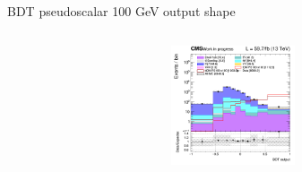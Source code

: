 \documentclass[8pt]{beamer}
\begin{document}
\begin{frame}{BDT pseudoscalar 100 GeV output shape}
\begin{columns}
\begin{column}{0.33\textwidth}
\begin{center}
			\begin{block}{}\end{block}	
     			\includegraphics[width=1.0\textwidth, height=100pt]{figs/2018/SmearSR-ttDM-pseudo100/log_cratio_ST_topCR_ll_BDT_ttDM100_ST_BDT_output_pseudoscalar100_customBinsAttempt7.png}
    		\end{center}		
		\end{column}
\end{columns}


\end{frame}
\end{document}
